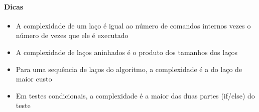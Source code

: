 \begin{frame}[label=main]
	\framesubtitle{Dicas}
		\begin{itemize}
			\item A complexidade de um laço é igual ao número de comandos internos 
			vezes o número de vezes que ele é executado
			\vfill
			\item A complexidade de laços aninhados é o produto dos tamanhos dos laços
			\vfill
			\item Para uma sequência de laços do algoritmo, a complexidade é a 
			do laço de maior custo
			\vfill
			\item Em testes condicionais, a complexidade é a maior das duas 
			partes (if/else) do teste
		\end{itemize}
\end{frame}


